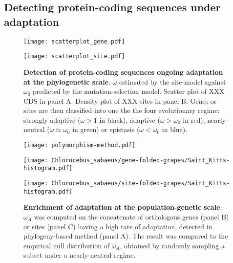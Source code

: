 \documentclass{article}
\begin{document}
\subsection*{Detecting protein-coding sequences under adaptation}

\begin{figure*}[h]
	\centering
	\begin{minipage}{0.49\linewidth}
		\texttt{[image: scatterplot\_gene.pdf]}
	\end{minipage}
	\hfill
	\begin{minipage}{0.49\linewidth}
		\texttt{[image: scatterplot\_site.pdf]}
	\end{minipage}
	\hfill
	\caption{ \textbf{Detection of protein-coding sequences ongoing adaptation at the phylogenetic scale}.
		$\omega$ estimated by the site-model against $\omega_{0}$ predicted by the mutation-selection model.
		Scatter plot of XXX CDS in panel A. Density plot of XXX sites in panel B.
		Genes or sites are then classified into one the the four evolutionary regime: strongly adaptive ($\omega > 1$ in black), adaptive ($\omega > \omega_{0}$ in red), nearly-neutral ($\omega \simeq \omega_{0}$ in green) or epistasis  ($\omega < \omega_{0}$ in blue). }
\end{figure*}

\begin{figure*}[h]
	\centering
	\texttt{[image: polymorphism-method.pdf]}
	\begin{minipage}{0.49\linewidth}
		\texttt{[image: Chlorocebus\_sabaeus/gene-folded-grapes/Saint\_Kitts-histogram.pdf]}
	\end{minipage}
	\hfill
	\begin{minipage}{0.49\linewidth}
		\texttt{[image: Chlorocebus\_sabaeus/site-folded-grapes/Saint\_Kitts-histogram.pdf]}
	\end{minipage}
	\hfill
	\caption{ \textbf{Enrichment of adaptation at the population-genetic scale}.
		$\omega_A$ was computed on the concatenate of orthologous genes (panel B) or sites (panel C) having a high rate of adaptation, detected in phylogeny-based method (panel A).
		The result was compared to the empirical null distribution of $\omega_A$, obtained by randomly sampling a subset under a nearly-neutral regime.
	}
\end{figure*}
\end{document}
